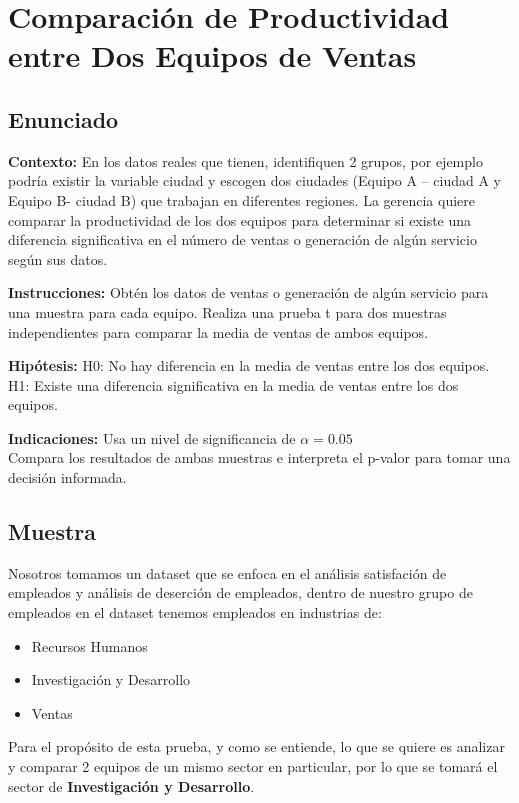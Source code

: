 \newpage
\section{Comparación de Productividad entre Dos Equipos de Ventas}

\subsection{Enunciado}
\textbf{Contexto:}
En los datos reales que tienen, identifiquen 2 grupos, por ejemplo podría existir la variable ciudad y
escogen dos ciudades (Equipo A – ciudad A y Equipo B- ciudad B) que trabajan en diferentes regiones. La gerencia quiere comparar
la productividad de los dos equipos para determinar si existe una diferencia significativa en el número de ventas
o generación de algún servicio según sus datos.

\textbf{Instrucciones:}
Obtén los datos de ventas o generación de algún servicio para una muestra para cada equipo.
Realiza una prueba t para dos muestras independientes para comparar la media de ventas de ambos equipos.

\textbf{Hipótesis:}
H0: No hay diferencia en la media de ventas entre los dos equipos.
H1: Existe una diferencia significativa en la media de ventas entre los dos equipos.

\textbf{Indicaciones:}
Usa un nivel de significancia de \( \alpha = 0.05 \)
\\
Compara los resultados de ambas muestras e interpreta el p-valor para tomar una decisión informada.

\subsection{Muestra}
Nosotros tomamos un dataset que se enfoca en el análisis satisfación de empleados \cite{ibm-hr} y
análisis de deserción de empleados, dentro de nuestro grupo de empleados en el dataset tenemos
empleados en industrias de:
\begin{itemize}
    \item Recursos Humanos
    \item Investigación y Desarrollo
    \item Ventas
\end{itemize}
Para el propósito de esta prueba, y como se entiende, lo que se quiere es analizar y comparar
2 equipos de un mismo sector en particular, por lo que se tomará el sector de
\textbf{Investigación y Desarrollo}.

